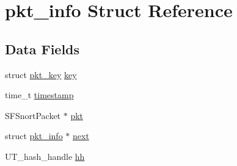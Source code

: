 \hypertarget{structpkt__info}{
\section{pkt\_\-info Struct Reference}
\label{structpkt__info}
}
\subsection*{Data Fields}
\begin{DoxyCompactItemize}
\item 
struct \hyperlink{structpkt__key}{pkt\_\-key} \hyperlink{structpkt__info_a231d4734d3c62292b06eb9ea4b49c339}{key}
\item 
time\_\-t \hyperlink{structpkt__info_a7f5090443f21e6290f0439f1bb872e92}{timestamp}
\item 
SFSnortPacket $\ast$ \hyperlink{structpkt__info_a8d5ebd04a32067b05387e5c5056fe168}{pkt}
\item 
struct \hyperlink{structpkt__info}{pkt\_\-info} $\ast$ \hyperlink{structpkt__info_a5ee3c51f2ca5768b94819182641ef168}{next}
\item 
UT\_\-hash\_\-handle \hyperlink{structpkt__info_a264e90d4b5d490de040f38c1072e142f}{hh}
\end{DoxyCompactItemize}


